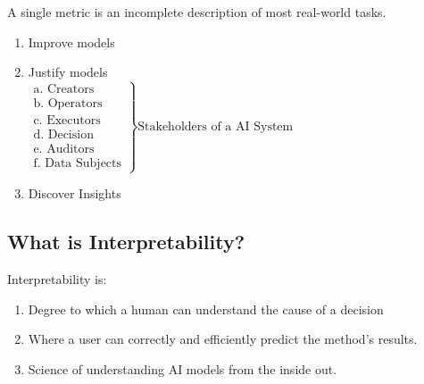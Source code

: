 \begin{motivation}
    A single metric is an incomplete description of most real-world tasks. 
    \begin{enumerate}
        \item Improve models
        \item Justify models \\
        $
        \left.
        \begin{array}{l}
        \text{a. Creators} \\
        \text{b. Operators} \\
        \text{c. Executors} \\
        \text{d. Decision} \\
        \text{e. Auditors} \\
        \text{f. Data Subjects}
        \end{array}
        \right\} \text{Stakeholders of a AI System}
        $
        \item Discover Insights 
    \end{enumerate}
\end{motivation}

\subsection{What is Interpretability?}
\begin{definition}
    Interpretability is:
    \begin{enumerate}
        \item Degree to which a human can understand the cause of a decision
        \item Where a user can correctly and efficiently predict the method's results. 
        \item Science of understanding AI models from the inside out. 
    \end{enumerate}
\end{definition}

